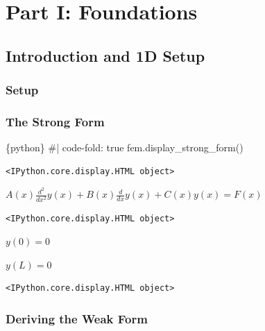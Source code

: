 \documentclass[
  11pt,
  a4paper,
]{scrbook}
\newenvironment{Shaded}{\begin{snugshade}}{\end{snugshade}}
\newcommand{\InformationTok}[1]{\textcolor[rgb]{0.37,0.37,0.37}{#1}}
\begin{document}
\part{Part I: Foundations}

\chapter{Introduction and 1D Setup}\label{introduction-and-1d-setup}

\section{Setup}\label{setup}

\section{The Strong Form}\label{the-strong-form}

\begin{Shaded}
\begin{Highlighting}[]
\InformationTok{\textasciigrave{}\textasciigrave{}\textasciigrave{}\{python\}}
\InformationTok{\#| code{-}fold: true}
\InformationTok{fem.display\_strong\_form()}
\InformationTok{\textasciigrave{}\textasciigrave{}\textasciigrave{}}
\end{Highlighting}
\end{Shaded}

\begin{verbatim}
<IPython.core.display.HTML object>
\end{verbatim}

$\displaystyle A{\left(x \right)} \frac{d^{2}}{d x^{2}} y{\left(x \right)} + B{\left(x \right)} \frac{d}{d x} y{\left(x \right)} + C{\left(x \right)} y{\left(x \right)} = F{\left(x \right)}$

\begin{verbatim}
<IPython.core.display.HTML object>
\end{verbatim}

$\displaystyle y{\left(0 \right)} = 0$

$\displaystyle y{\left(L \right)} = 0$

\begin{verbatim}
<IPython.core.display.HTML object>
\end{verbatim}

\section{Deriving the Weak Form}\label{deriving-the-weak-form}
\end{document}
